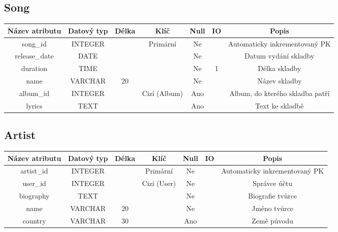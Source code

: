 \subsection*{Song}
\begin{tabular}{ |c|c c c c c|c| }
    \hline
    \textbf{Název atributu} & \textbf{Datový typ} & \textbf{Délka} & \textbf{Klíč} & \textbf{Null} & \textbf{IO} & \textbf{Popis}                         \\
    \hline
    song\_id                & INTEGER             &                & Primární      & Ne            &             & Automaticky inkrementovaný PK   \\
    release\_date           & DATE                &                &               & Ne            &             & Datum vydání skladby            \\
    duration                & TIME                &                &               & Ne            & 1           & Délka skladby                   \\
    name                    & VARCHAR             & 20             &               & Ne            &             & Název skladby                   \\
    album\_id               & INTEGER             &                & Cizí (Album)  & Ano           &             & Album, do kterého skladba patří \\
    lyrics                  & TEXT                &                &               & Ano           &             & Text ke skladbě                 \\
    \hline
\end{tabular}
\bigskip

\subsection*{Artist}
\begin{tabular}{ |c|c c c c c|c| }
    \hline
    \textbf{Název atributu} & \textbf{Datový typ} & \textbf{Délka} & \textbf{Klíč} & \textbf{Null} & \textbf{IO} & \textbf{Popis}                         \\
    \hline
    artist\_id              & INTEGER             &                & Primární      & Ne            &             & Automaticky inkrementovaný PK \\
    user\_id                & INTEGER             &                & Cizí (User)   & Ne            &             & Správce účtu                  \\
    biography               & TEXT                &                &               & Ne            &             & Biografie tvůrce              \\
    name                    & VARCHAR             & 20             &               & Ne            &             & Jméno tvůrce                  \\
    country                 & VARCHAR             & 30             &               & Ano           &             & Země původu                   \\
    \hline
\end{tabular}
\bigskip

